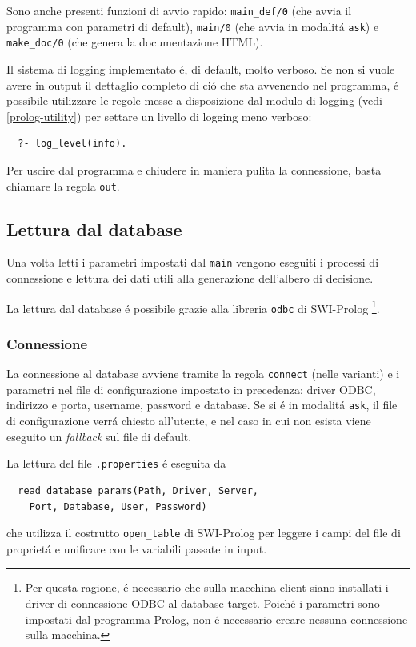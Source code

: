 \documentclass[preprint]{acm_proc_article-sp}
\begin{document}
Sono anche presenti funzioni di avvio rapido: \verb|main_def/0| (che avvia il programma con parametri di default), \verb|main/0| (che avvia in modalit\'a \verb|ask|) e \verb|make_doc/0| (che genera la documentazione HTML).

Il sistema di logging implementato \'e, di default, molto verboso. Se non si vuole avere in output il dettaglio completo di ci\'o che sta avvenendo nel programma, \'e possibile utilizzare le regole messe a disposizione dal modulo di logging (vedi \ref{prolog-utility}) per settare un livello di logging meno verboso:
\begin{verbatim}
  ?- log_level(info).
\end{verbatim}

Per uscire dal programma e chiudere in maniera pulita la connessione, basta chiamare la regola \verb|out|.

\subsection{Lettura dal database}
\label{prolog-database}
Una volta letti i parametri impostati dal \verb|main| vengono eseguiti i processi di connessione e lettura dei dati utili alla generazione dell'albero di decisione.

La lettura dal database \'e possibile grazie alla libreria \verb|odbc| di SWI-Prolog \footnote{Per questa ragione, \'e necessario che sulla macchina client siano installati i driver di connessione ODBC al database target. Poich\'e i parametri sono impostati dal programma Prolog, non \'e necessario creare nessuna connessione sulla macchina.}.

\subsubsection{Connessione}
La connessione al database avviene tramite la regola \verb|connect| (nelle varianti) e i parametri nel file di configurazione impostato in precedenza: driver ODBC, indirizzo e porta, username, password e database. Se si \'e in modalit\'a \verb|ask|, il file di configurazione verr\'a chiesto all'utente, e nel caso in cui non esista viene eseguito un \textit{fallback} sul file di default.

La lettura del file \verb|.properties| \'e eseguita da
\begin{verbatim}
  read_database_params(Path, Driver, Server, 
  	Port, Database, User, Password)
\end{verbatim}
che utilizza il costrutto \verb|open_table| di SWI-Prolog per leggere i campi del file di propriet\'a e unificare con le variabili passate in input.
\end{document}
